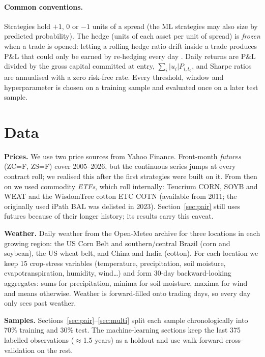 \documentclass[11pt,a4paper]{article}
\begin{document}
\paragraph{Common conventions.} Strategies hold $+1$, $0$ or $-1$ units of a spread (the ML strategies may also size
by predicted probability). The hedge (units of each
asset per unit of spread) is \emph{frozen} when a trade is opened: letting a rolling hedge ratio drift inside a trade
produces P\&L that could only be earned by re-hedging every day \citep[\S2.4]{lopezdeprado2018}. Daily returns are P\&L
divided by the gross capital committed at entry, $\sum_i |u_i| P_{i,t_0}$, and Sharpe ratios are annualised with a zero
risk-free rate. Every threshold, window and hyperparameter is chosen on a training sample and evaluated once on a later
test sample.

\section{Data}\label{sec:data}
\textbf{Prices.} We use two price sources from Yahoo Finance. Front-month \emph{futures} (ZC=F, ZS=F) cover
2005--2026, but the continuous series jumps at every contract roll; we realised this after the first strategies were
built on it. From then on we used commodity \emph{ETFs}, which roll internally: Teucrium CORN, SOYB and WEAT and the
WisdomTree cotton ETC COTN (available from 2011; the originally used iPath BAL was delisted in 2023). Section~\ref{sec:pair}
still uses futures because of their longer history; its results carry this caveat.

\textbf{Weather.} Daily weather from the Open-Meteo archive for three locations in each growing region: the US Corn
Belt and southern/central Brazil (corn and soybean), the US wheat belt, and China and India (cotton). For each location
we keep 15 crop-stress variables (temperature, precipitation, soil moisture, evapotranspiration, humidity, wind\ldots)
and form 30-day backward-looking aggregates: sums for precipitation, minima for soil moisture, maxima for wind and means
otherwise. Weather is forward-filled onto trading days, so every day only sees past weather.

\textbf{Samples.} Sections~\ref{sec:pair}--\ref{sec:multi} split each sample chronologically into 70\% training and
30\% test. The machine-learning sections keep the last 375 labelled observations ($\approx$1.5 years) as a holdout
and use walk-forward cross-validation on the rest.
\end{document}
